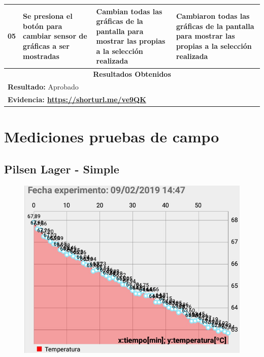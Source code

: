 \begin{minipage}{0.95\textwidth}
\begin{center}
\begin{tabularx}{\textwidth}{ | p{2cm} | X | X | X |}
        \hline
        05 & Se presiona el botón para cambiar sensor de gráficas a ser mostradas & Cambian todas las gráficas de la pantalla para mostrar las propias a la selección realizada & Cambiaron todas las gráficas de la pantalla para mostrar las propias a la selección realizada \\
        \hline
        \multicolumn{4}{|c|}{\textbf{Resultados Obtenidos}} \\
        \hline
        \multicolumn{4}{|l|}{\textbf{Resultado:} Aprobado} \\
        \hline
        \multicolumn{4}{|l|}{\textbf{Evidencia: \url{https://shorturl.me/ve9QK} }} \\
        \hline
     \end{tabularx}
    \label{CP007}
    \end{center}
    \end{minipage}
    
    \chapter{Mediciones pruebas de campo}
    \label{GraficasPruebasCampo}
    \section{Pilsen Lager - Simple}
            \begin{figure}[H]
                \centering
                \includegraphics[scale=0.65]{Pruebas/SimpleExp1.jpg}
                \label{fig:SimpTempExp1}
            \end{figure}
         
